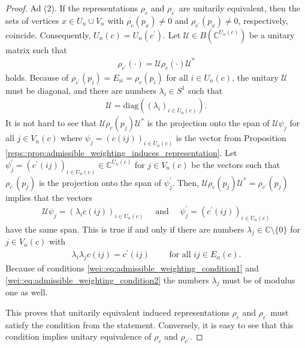 \documentclass[a4paper]{amsart}
\newcommand{\C}{\mathbb{C}}
\begin{document}
\begin{proof}
    Ad (2). If the representations $\rho_c$ and $\rho_{c^\prime}$ are unitarily equivalent, then the sets of vertices $x \in U_n \cup V_n$ with $\rho_c(p_x) \neq 0$ and $\rho_{c^\prime}(p_x) \neq 0$, respectively, coincide. Consequently, $U_n(c) = U_n(c^\prime)$. Let $\mathcal{U} \in B(\C^{U_n(c)})$ be a unitary matrix such that
    \begin{align*}
        \rho_{c^\prime}(\cdot) = \mathcal{U} \rho_c(\cdot) \mathcal{U}^\ast
    \end{align*}
    holds. Because of $\rho_{c^\prime}(p_i) = E_{ii} = \rho_c(p_i)$ for all $i \in U_n(c)$, the unitary $\mathcal{U}$ must be diagonal, and there are numbers $\lambda_i \in S^1$ such that
    \begin{align*}
        \mathcal{U} = \mathrm{diag}((\lambda_i)_{i \in U_n(c)}).
    \end{align*}
    It is not hard to see that $\mathcal{U} \rho_c(p_j) \mathcal{U}^\ast$ is the projection onto the span of $\mathcal{U} \psi_j$ for all $j \in V_n(c)$ where $\psi_j = (c(ij))_{i \in U_n(c)}$ is the vector from Proposition \ref{reps::prop:admissible_weighting_induces_representation}. Let $\psi_j^\prime = (c^\prime(ij))_{i \in U_n(c)} \in \C^{U_n(c)}$ for $j \in V_n(c)$ be the vectors such that $\rho_{c^\prime}(p_j)$ is the projection onto the span of $\psi_j^\prime$. Then, $\mathcal{U} \rho_c(p_j) \mathcal{U}^\ast = \rho_{c^\prime}(p_j)$ implies that the vectors
    \begin{align*}
        \mathcal{U} \psi_j = (\lambda_i c(ij))_{i \in U_n(c)} \quad \text{ and } \quad \psi_j^\prime = (c^\prime(ij))_{i \in U_n(c)}
    \end{align*}
    have the same span. This is true if and only if there are numbers $\lambda_j \in \C \setminus \{0\}$ for $j \in V_n(c)$ with
    \begin{align*}
        \lambda_i \lambda_j c(ij) = c^\prime(ij) \qquad \text{ for all } ij \in E_n(c).
    \end{align*}
    Because of conditions \eqref{wei::eq:admissible_weighting_condition1} and \eqref{wei::eq:admissible_weighting_condition2} the numbers $\lambda_j$ must be of modulus one as well. 
    
    This proves that unitarily equivalent induced representations $\rho_c$ and $\rho_{c^\prime}$ must satisfy the condition from the statement. Conversely, it is easy to see that this condition implies unitary equivalence of $\rho_c$ and $\rho_{c^\prime}$.


\end{proof}
\end{document}

